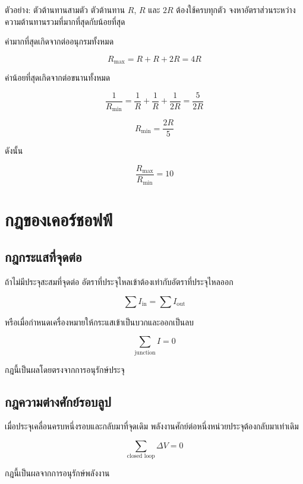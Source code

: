 \begin{examplebox}{ตัวอย่าง: ตัวต้านทานสามตัว}
ตัวต้านทาน $R$, $R$ และ $2R$ ต้องใช้ครบทุกตัว จงหาอัตราส่วนระหว่างความต้านทานรวมที่มากที่สุดกับน้อยที่สุด

ค่ามากที่สุดเกิดจากต่ออนุกรมทั้งหมด

\[
R_{\max}=R+R+2R=4R
\]

ค่าน้อยที่สุดเกิดจากต่อขนานทั้งหมด

\[
\frac{1}{R_{\min}}
=\frac{1}{R}+\frac{1}{R}+\frac{1}{2R}
=\frac{5}{2R}
\]

\[
R_{\min}=\frac{2R}{5}
\]

ดังนั้น

\[
\boxed{\frac{R_{\max}}{R_{\min}}=10}
\]
\end{examplebox}

\section{กฎของเคอร์ชอฟฟ์}

\subsection{กฎกระแสที่จุดต่อ}

ถ้าไม่มีประจุสะสมที่จุดต่อ อัตราที่ประจุไหลเข้าต้องเท่ากับอัตราที่ประจุไหลออก

\[
\sum I_{\text{in}}=\sum I_{\text{out}}
\]

หรือเมื่อกำหนดเครื่องหมายให้กระแสเข้าเป็นบวกและออกเป็นลบ

\begin{tcolorbox}[title={กฎจุดต่อของเคอร์ชอฟฟ์}]
\[
\boxed{\sum_{\text{junction}} I=0}
\]
\end{tcolorbox}

กฎนี้เป็นผลโดยตรงจากการอนุรักษ์ประจุ

\subsection{กฎความต่างศักย์รอบลูป}

เมื่อประจุเคลื่อนครบหนึ่งรอบและกลับมาที่จุดเดิม พลังงานศักย์ต่อหนึ่งหน่วยประจุต้องกลับมาเท่าเดิม

\begin{tcolorbox}[title={กฎลูปของเคอร์ชอฟฟ์}]
\[
\boxed{\sum_{\text{closed loop}}\Delta V=0}
\]
\end{tcolorbox}

กฎนี้เป็นผลจากการอนุรักษ์พลังงาน

